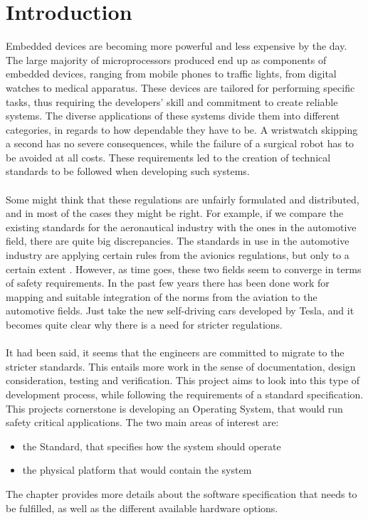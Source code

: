 \chapter{Introduction}\label{ch:introduction} 

Embedded devices are becoming more powerful and less expensive by the day. The large majority of
microprocessors produced end up as components of embedded devices, ranging from mobile phones
to traffic lights, from digital watches to medical apparatus. These devices are tailored for 
performing specific tasks, thus requiring the developers' skill and commitment to create reliable
systems. The diverse applications of these systems divide them into different categories, in regards to
how dependable they have to be. A wristwatch skipping a second has no severe consequences, while the
failure of a surgical robot has to be avoided at all costs. These requirements led to the creation 
of technical standards to be followed when developing such systems. 
\\\\
Some might think that these regulations are unfairly formulated and distributed, and in most
of the cases they might be right. For example, if we compare the existing standards for the aeronautical industry with the ones in the automotive field, there are quite big discrepancies. The standards 
in use in the automotive industry are applying certain rules from the avionics regulations, 
but only to a certain extent
\cite {can_cars_fly}.
However, as time goes, these two fields seem to converge in terms of safety requirements. 
In the past few years there has been done work for mapping and suitable integration 
of the norms from the aviation to the automotive fields. Just take the new self-driving 
cars developed by Tesla, and it becomes quite clear why there is a need for stricter regulations. 
\\\\
It had been said, it seems that the engineers are committed to migrate to the stricter standards. 
This entails more work in the sense of documentation, design consideration, testing and verification.
This project aims to look into this type of development process, while following the requirements 
of a standard specification.
This project\textquotesingle s cornerstone is developing an Operating System, that would run safety critical 
applications. The two main areas of interest are:
\begin{itemize}
\item the Standard, that specifies how the system should operate
\item the physical platform that would contain the system
\end{itemize}
The  chapter provides more details about the software specification that needs to be fulfilled,
as well as the different available hardware options.